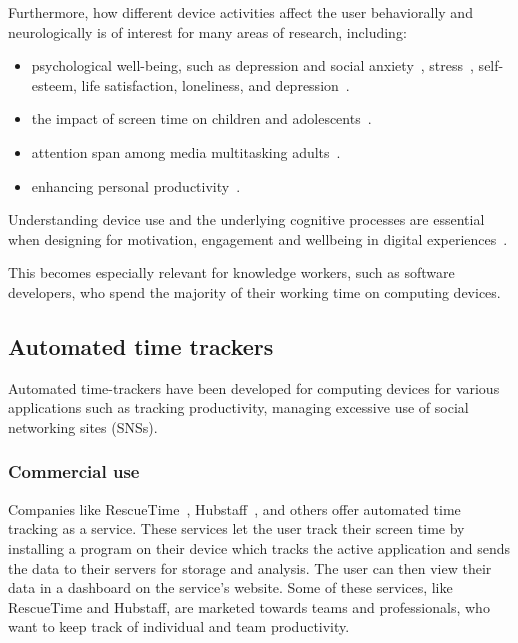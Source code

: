 \documentclass{IEEEtran}
\begin{document}
\begin{refsection}
Furthermore, how different device activities affect the user behaviorally and neurologically is of interest for many areas of research, including:

\begin{itemize}
    \item psychological well-being, such as depression and social anxiety~\cite{selfhout_different_2009,shah_nonrecursive_2002}, stress~\cite{mark_stress_2014}, self-esteem, life satisfaction, loneliness, and depression~\cite{huang_time_2017}.
    \item the impact of screen time on children and adolescents~\cite{subrahmanyam_impact_2001}.
    \item attention span among media multitasking adults~\cite{mark_stress_2014}.
    \item enhancing personal productivity~\cite{kim_timeaware_2016}.
\end{itemize}

Understanding device use and the underlying cognitive processes are essential when designing for motivation, engagement and wellbeing in digital experiences~\cite{peters_designing_2018}.

This becomes especially relevant for knowledge workers, such as software developers, who spend the majority of their working time on computing devices.


\subsection{Automated time trackers}

Automated time-trackers have been developed for computing devices for various applications such as tracking productivity, managing excessive use of social networking sites (SNSs).

\subsubsection{Commercial use}

Companies like RescueTime~\cite{noauthor_rescuetime_nodate}, Hubstaff~\cite{noauthor_hubstaff_nodate}, and others offer automated time tracking as a service. These services let the user track their screen time by installing a program on their device which tracks the active application and sends the data to their servers for storage and analysis. The user can then view their data in a dashboard on the service's website. Some of these services, like RescueTime and Hubstaff, are marketed towards teams and professionals, who want to keep track of individual and team productivity.


\end{refsection}
\end{document}
